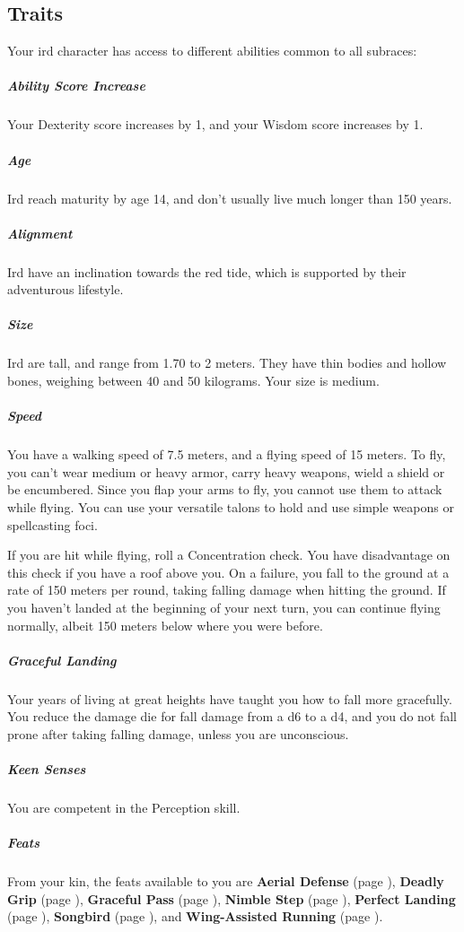 \subsection*{Traits}
    Your ird character has access to different abilities common to all subraces:

    \subparagraph{Ability Score Increase} Your Dexterity score increases by 1, and your Wisdom score increases by 1.

    \subparagraph{Age} Ird reach maturity by age 14, and don't usually live much longer than 150 years.

    \subparagraph{Alignment} Ird have an inclination towards the red tide, which is supported by their adventurous lifestyle.

    \subparagraph{Size} Ird are tall, and range from 1.70 to 2 meters.
    They have thin bodies and hollow bones, weighing between 40 and 50 kilograms.
    Your size is medium.

    \subparagraph{Speed} You have a walking speed of 7.5 meters, and a flying speed of 15 meters.
    To fly, you can't wear medium or heavy armor, carry heavy weapons, wield a shield or be encumbered.
    Since you flap your arms to fly, you cannot use them to attack while flying.
    You can use your versatile talons to hold and use simple weapons or spellcasting foci.

    If you are hit while flying, roll a Concentration check.
    You have disadvantage on this check if you have a roof above you.
    On a failure, you fall to the ground at a rate of 150 meters per round, taking falling damage when hitting the ground.
    If you haven't landed at the beginning of your next turn, you can continue flying normally, albeit 150 meters below where you were before.

    \subparagraph{Graceful Landing} Your years of living at great heights have taught you how to fall more gracefully.
    You reduce the damage die for fall damage from a d6 to a d4, and you do not fall prone after taking falling damage, unless you are unconscious.

    \subparagraph{Keen Senses} You are competent in the Perception skill.

    \subparagraph{Feats} From your kin, the feats available to you are
    \textbf{Aerial Defense} (page \pageref{feat::aerialdefense}),
    \textbf{Deadly Grip} (page \pageref{feat::deadlygrip}),
    \textbf{Graceful Pass} (page \pageref{feat::gracefulpass}),
    \textbf{Nimble Step} (page \pageref{feat::nimblestep}),
    \textbf{Perfect Landing} (page \pageref{feat::perfectlanding}),
    \textbf{Songbird} (page \pageref{feat::songbird}), and
    \textbf{Wing-Assisted Running} (page \pageref{feat::wingassistedrunning}).

